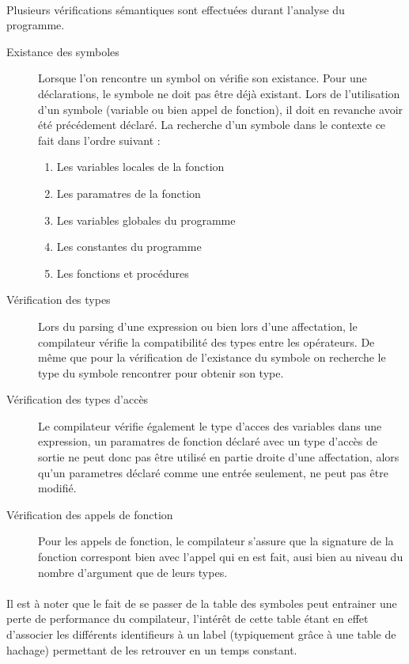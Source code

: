 \paragraph{}Plusieurs vérifications sémantiques sont effectuées durant 
l'analyse du programme.

\begin{description}
 \item[Existance des symboles] Lorsque l'on rencontre un symbol on vérifie son 
existance. Pour une déclarations, le symbole ne doit pas être déjà existant. 
Lors de l'utilisation d'un symbole (variable ou bien appel de fonction), il doit
en revanche avoir été précédement déclaré. La recherche d'un symbole dans le
contexte ce fait dans l'ordre suivant :

 \begin{enumerate}
  \item Les variables locales de la fonction
  \item Les paramatres de la fonction
  \item Les variables globales du programme
  \item Les constantes du programme
  \item Les fonctions et procédures
 \end{enumerate}

 \item[Vérification des types] Lors du parsing d'une expression ou bien lors 
d'une affectation, le compilateur vérifie la compatibilité des types entre les
opérateurs. De même que pour la vérification de l'existance du symbole
on recherche le type du symbole rencontrer pour obtenir son type.

 \item[Vérification des types d'accès] Le compilateur vérifie également le type
d'acces des variables dans une expression, un paramatres de fonction
déclaré avec un type d'accès de sortie ne peut donc pas être utilisé en partie 
droite d'une affectation, alors qu'un parametres déclaré comme une entrée
seulement, ne peut pas être modifié.
 
 \item[Vérification des appels de fonction] Pour les appels de fonction, le 
compilateur s'assure que la signature de la fonction correspont bien avec 
l'appel qui en est fait, ausi bien au niveau du nombre d'argument que de leurs 
types.
\end{description}

\paragraph{}Il est à noter que le fait de se passer de la table des symboles 
peut entrainer une perte de performance du compilateur, l'intérêt de cette 
table étant en effet d'associer les différents identifieurs à un label 
(typiquement grâce à une table de hachage) permettant de les 
retrouver en un temps constant.

